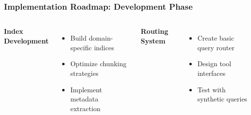 \begin{frame}
    \frametitle{Implementation Roadmap: Development Phase}
    
    \begin{center}
    \end{center}
    
    \begin{columns}
        \textbf{Index Development}
        \begin{itemize}
            \item Build domain-specific indices
            \item Optimize chunking strategies
            \item Implement metadata extraction
        \end{itemize}
        
        \textbf{Routing System}
        \begin{itemize}
            \item Create basic query router
            \item Design tool interfaces
            \item Test with synthetic queries
        \end{itemize}
    \end{columns}
\end{frame}

